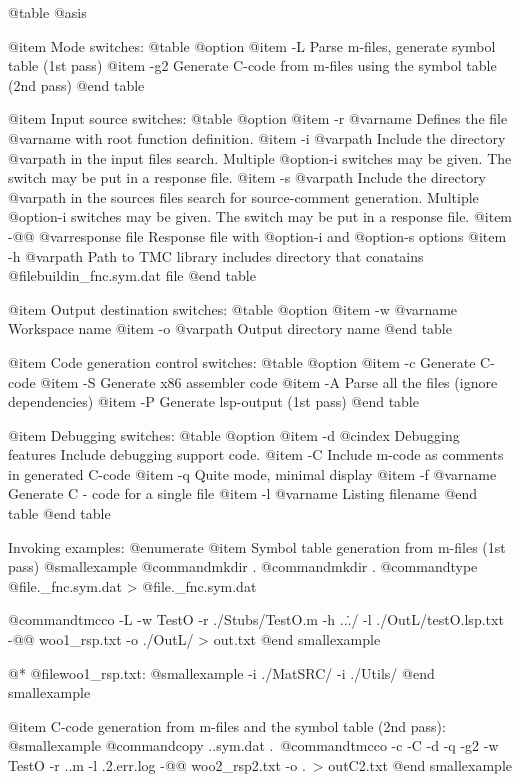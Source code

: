 @table @asis

@item Mode switches:
@table @option
@item -L
Parse m-files, generate symbol table (1st pass)
@item -g2
Generate C-code from m-files using the symbol table (2nd pass)
@end table

@item Input source switches:
@table @option
@item -r @var{name}
Defines  the file @var{name} with root function definition.
@item -i @var{path} 
Include the directory @var{path} in the input files search. Multiple @option{-i} switches may be given. The switch may be put in a response file.
@item -s @var{path}
Include the directory @var{path} in the sources files search for source-comment generation. Multiple @option{-i} switches may be given. The switch may be put in a response file.
@item -@@ @var{response file}
Response file with @option{-i} and @option{-s} options
@item -h @var{path}
Path to TMC library includes directory that conatains @file{buildin_fnc.sym.dat} file
@end table

@item Output destination switches:
@table @option
@item -w @var{name}
Workspace name
@item -o  @var{path}
Output directory name
@end table

@item Code generation control switches:
@table @option
@item -c
 Generate C-code
@item -S
 Generate x86 assembler code
@item -A
 Parse all the files (ignore dependencies)
@item -P
 Generate lsp-output (1st pass)
@end table

@item Debugging switches:
@table @option
@item -d
@cindex  Debugging features
 Include debugging support code.
@item -C
 Include m-code as comments in generated C-code
@item -q
 Quite mode, minimal display
@item -f @var{name}
 Generate C - code for a single file
@item -l @var{name}
 Listing filename
@end table
@end table


Invoking examples:
@enumerate
@item Symbol table generation from m-files (1st pass)
@smallexample
@command{mkdir} .\OutL
@command{mkdir} .\OutC
@command{type}  @file{.\Stubs\external_fnc.sym.dat} > @file{.\OutL\external_fnc.sym.dat}

@command{tmcco}  -L -w TestO  -r ./Stubs/TestO.m -h ..\../ -l ./OutL/testO.lsp.txt
 -@@ woo1_rsp.txt  -o ./OutL/ > out.txt
@end smallexample

@*
@file{woo1_rsp.txt}:
@smallexample
-i ./MatSRC/
-i ./Utils/
@end smallexample

@item C-code generation from m-files and the symbol table (2nd pass):
@smallexample
@command{copy} 	.\OutL\TestO.sym.dat .\Stubs\
@command{tmcco} -c -C   -d -q  -g2  -w TestO  -r .\Stubs\TestO.m -l .\OutC\testO2.err.log
 -@@ woo2_rsp2.txt  -o .\OutC\ > outC2.txt
@end smallexample

